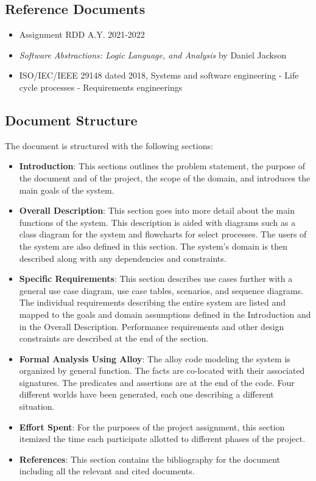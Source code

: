 \subsection{Reference Documents}
\begin{itemize}
\item Assignment RDD A.Y. 2021-2022
\item \textit{Software Abstractions: Logic Language, and Analysis} by Daniel Jackson
\item ISO/IEC/IEEE 29148 dated 2018, Systems and software engineering - Life cycle processes - Requirements engineerings
\end{itemize}



\subsection{Document Structure}
The document is structured with the following sections:
\begin{itemize}
\item \textbf{Introduction}: This sections outlines the problem statement, the purpose of the document and of the project, the scope of the domain, and introduces the main goals of the system. 
\item \textbf{Overall Description}: This section goes into more detail about the main functions of the system. This description is aided with diagrams such as a class diagram for the system and flowcharts for select processes. The users of the system are also defined in this section. The system's domain is then described along with any dependencies and constraints. 
\item \textbf{Specific Requirements}: This section describes use cases further with a general use case diagram, use case tables, scenarios, and sequence diagrams. The individual requirements describing the entire system are listed and mapped to the goals and domain assumptions defined in the Introduction and in the Overall Description. Performance requirements and other design constraints are described at the end of the section.
\item \textbf{Formal Analysis Using Alloy}: The alloy code modeling the system is organized by general function. The facts are co-located with their associated signatures. The predicates and assertions are at the end of the code. Four different worlds have been generated, each one describing a different situation.
\item \textbf{Effort Spent}: For the purposes of the project assignment, this section itemized the time each participate allotted to different phases of the project. 
\item \textbf{References}: This section contains the bibliography for the document including all the relevant and cited documents.  
\end{itemize}


